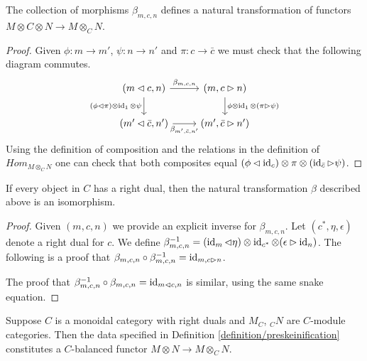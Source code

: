 \begin{lemma}\label{beta_natural}
  The collection of morphisms $\beta_{m,c,n}$ defines a natural transformation
  of functors $M\otimes C \otimes N\to M\otimes_C N$.
\end{lemma}

\begin{proof}
  Given $\phi:m\to m'$, $\psi: n\to n'$ and $\pi:c\to \bar{c}$ we must check
  that the following diagram commutes.
  \[
    \begin{tikzcd}
      {(m\lhd c, n)} & {(m,c\rhd n)} \\
      {(m'\lhd \bar{c}, n')} & {(m',\bar{c}\rhd n')}
      \arrow["{\beta_{m,c,n}}", from=1-1, to=1-2]
      \arrow["{(\phi\lhd\pi)\otimes\id_1\otimes\psi}"', from=1-1, to=2-1]
      \arrow["{\phi\otimes\id_1\otimes(\pi\rhd\psi)}", from=1-2, to=2-2]
      \arrow["{\beta_{m',\bar{c},n'}}"', from=2-1, to=2-2]
    \end{tikzcd}
  \]
  Using the definition of composition and the relations in the definition of
  $Hom_{M\otimes_C N}$ one can check that both composites equal
  $(\phi\lhd\operatorname{id}_c)\otimes\pi\otimes(\operatorname{id}_{\bar{c}}\rhd\psi)$.
\end{proof}

\begin{lemma}\label{beta_invertible}
  If every object in $C$ has a right dual, then the natural transformation
  $\beta$ described above is an isomorphism.
\end{lemma}

\begin{proof}
  Given $(m,c,n)$ we provide an explicit inverse for $\beta_{m,c,n}$. Let
  $(c^*,\eta,\epsilon)$ denote a right dual for $c$. We define
  $\beta^{-1}_{m,c,n}=(\operatorname{id}_m\lhd\eta)\otimes\operatorname{id}_{c^*}\otimes
  (\epsilon\rhd\operatorname{id}_n)$. The following is a proof that
  $\beta_{m,c,n}\circ\beta_{m,c,n}^{-1}=\operatorname{id}_{m,c\rhd n}$.
  \begin{center}\end{center}

  The proof that $\beta_{m,c,n}^{-1}\circ\beta_{m,c,n}=\operatorname{id}_{m\lhd c,n}$ is
  similar, using the same snake equation.
\end{proof}


\begin{proposition}\label{is_balanced}

\noindent Suppose $C$ is a monoidal category with right duals and $M_C$, $_{C}N$ are
$C$-module categories. Then the data specified in
Definition \ref{definition/preskeinification} constitutes a $C$-balanced
functor $M\otimes N\to M\otimes_C N$.
\end{proposition}

